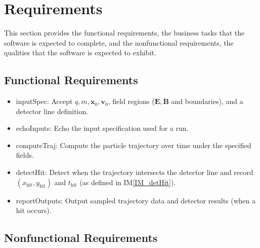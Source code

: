 \documentclass[12pt]{article}
\newcommand{\iref}[1]{IM\ref{#1}}
\newcounter{reqnum} %
\begin{document}


\section{Requirements}


This section provides the functional requirements, the business tasks that the
software is expected to complete, and the nonfunctional requirements, the
qualities that the software is expected to exhibit.

\subsection{Functional Requirements}

\noindent \begin{itemize}

\item[R\refstepcounter{reqnum}\thereqnum \label{R_inputSpec}:]
inputSpec: Accept $q,m,\mathbf{x}_0,\mathbf{v}_0$, field regions ($\mathbf{E},\mathbf{B}$ and
boundaries), and a detector line definition.

\item[R\refstepcounter{reqnum}\thereqnum \label{R_echoInputs}:]
echoInputs: Echo the input specification used for a run.

\item[R\refstepcounter{reqnum}\thereqnum \label{R_computeTraj}:]
computeTraj: Compute the particle trajectory over time under the specified fields.

\item[R\refstepcounter{reqnum}\thereqnum \label{R_detectHit}:]
detectHit: Detect when the trajectory intersects the detector line and record
$(x_{\mathrm{hit}}, y_{\mathrm{hit}})$ and $t_{\mathrm{hit}}$ (as defined in
\iref{IM_detHit}).

\item[R\refstepcounter{reqnum}\thereqnum \label{R_reportOutputs}:]
reportOutputs: Output sampled trajectory data and detector results (when a hit occurs).

\end{itemize}


\subsection{Nonfunctional Requirements}
\end{document}
